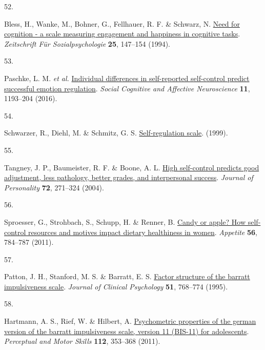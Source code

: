 \documentclass[
  man,floatsintext]{apa6}
\newlength{\cslhangindent}
\newlength{\csllabelwidth}
\newlength{\cslentryspacingunit} %
\newenvironment{CSLReferences}[2] %
 {%
  \setlength{\parindent}{0pt}
  \ifodd #1
  \let\oldpar\par
  \def\par{\hangindent=\cslhangindent\oldpar}
  \fi
  \setlength{\parskip}{#2\cslentryspacingunit}
 }%
 {}
\newcommand{\CSLLeftMargin}[1]{\parbox[t]{\csllabelwidth}{#1}}
\newcommand{\CSLRightInline}[1]{\parbox[t]{\linewidth - \csllabelwidth}{#1}\break}
\begin{document}
\begin{CSLReferences}{0}{0}
\leavevmode{}%
\CSLLeftMargin{52. }%
\CSLRightInline{Bless, H., Wanke, M., Bohner, G., Fellhauer, R. F. \& Schwarz, N. \href{\%3CGo\%20to\%20ISI\%3E://WOS:A1994NR83900004}{Need for cognition - a scale measuring engagement and happiness in cognitive tasks}. \emph{Zeitschrift Für Sozialpsychologie} \textbf{25}, 147--154 (1994).}

\leavevmode{}%
\CSLLeftMargin{53. }%
\CSLRightInline{Paschke, L. M. \emph{et al.} \href{https://doi.org/10.1093/scan/nsw036}{Individual differences in self-reported self-control predict successful emotion regulation}. \emph{Social Cognitive and Affective Neuroscience} \textbf{11}, 1193--204 (2016).}

\leavevmode{}%
\CSLLeftMargin{54. }%
\CSLRightInline{Schwarzer, R., Diehl, M. \& Schmitz, G. S. \href{http://userpage.fu-berlin.de/~health/selfreg_g.htm}{Self-regulation scale}. (1999).}

\leavevmode{}%
\CSLLeftMargin{55. }%
\CSLRightInline{Tangney, J. P., Baumeister, R. F. \& Boone, A. L. \href{https://doi.org/10.1111/j.0022-3506.2004.00263.x}{High self-control predicts good adjustment, less pathology, better grades, and interpersonal success}. \emph{Journal of Personality} \textbf{72}, 271--324 (2004).}

\leavevmode{}%
\CSLLeftMargin{56. }%
\CSLRightInline{Sproesser, G., Strohbach, S., Schupp, H. \& Renner, B. \href{https://doi.org/10.1016/j.appet.2011.01.028}{Candy or apple? How self-control resources and motives impact dietary healthiness in women}. \emph{Appetite} \textbf{56}, 784--787 (2011).}

\leavevmode{}%
\CSLLeftMargin{57. }%
\CSLRightInline{Patton, J. H., Stanford, M. S. \& Barratt, E. S. \href{https://doi.org/10.1002/1097-4679(199511)51:6\%3C768::aid-jclp2270510607\%3E3.0.co;2-1}{Factor structure of the barratt impulsiveness scale}. \emph{Journal of Clinical Psychology} \textbf{51}, 768--774 (1995).}

\leavevmode{}%
\CSLLeftMargin{58. }%
\CSLRightInline{Hartmann, A. S., Rief, W. \& Hilbert, A. \href{https://doi.org/10.2466/08.09.10.PMS.112.2.353-368}{Psychometric properties of the german version of the barratt impulsiveness scale, version 11 (BIS-11) for adolescents}. \emph{Perceptual and Motor Skills} \textbf{112}, 353--368 (2011).}


\end{CSLReferences}
\end{document}
